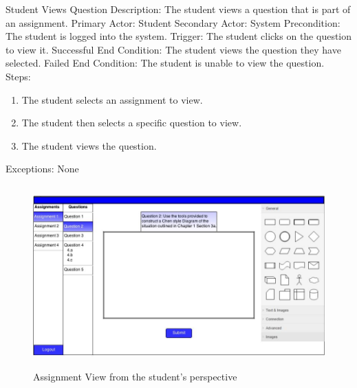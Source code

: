     
    \begin{section}{Student Views Question}
        Description: The student views a question that is part of an assignment. \newline
        Primary Actor: Student \newline
        Secondary Actor: System \newline
        Precondition: The student is logged into the system. \newline
        Trigger: The student clicks on the question to view it. \newline
        Successful End Condition: The student views the question they have selected. \newline
        Failed End Condition: The student is unable to view the question. \newline
        \newline
        Steps:
        \begin{enumerate}
            \item{The student selects an assignment to view.}
            \item{The student then selects a specific question to view.}
            \item{The student views the question.}
        \end{enumerate}
        Exceptions: None
        
                    \begin{figure}[H]
            \centerline{\includegraphics[height=7cm]{StudentQuestion.jpg}}
            \caption{Assignment View from the student's perspective}
    \end{figure}
        
    \end{section}


